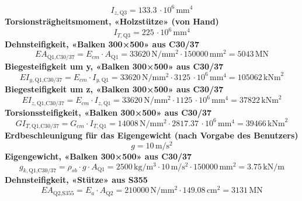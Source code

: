 \documentclass[11pt,a4paper]{article}
\begin{document}
\begin{equation*}
I_{z,\text{Q3}} = 133.3\,\cdot 10^{6}\,\mathrm{mm}^{4}
\end{equation*}
\noindent\textbf{Torsionsträgheitsmoment, «Holzstütze» (von Hand)}
\begin{equation*}
I_{T,\text{Q3}} = 225\,\cdot 10^{6}\,\mathrm{mm}^{4}
\end{equation*}
\noindent\textbf{Dehnsteifigkeit, «Balken 300×500» aus C30/37}
\begin{equation*}
EA_{\text{Q1,C30/37}} = E_{cm} \cdot A_{\text{Q1}} = 33620\,\mathrm{N}/\mathrm{mm}^{2} \cdot 150000\,\mathrm{mm}^{2} = 5043\,\mathrm{MN}
\end{equation*}
\noindent\textbf{Biegesteifigkeit um y, «Balken 300×500» aus C30/37}
\begin{equation*}
EI_{y,\text{Q1,C30/37}} = E_{cm} \cdot I_{y,\text{Q1}} = 33620\,\mathrm{N}/\mathrm{mm}^{2} \cdot 3125\,\cdot 10^{6}\,\mathrm{mm}^{4} = 105062\,\mathrm{kNm}^{2}
\end{equation*}
\noindent\textbf{Biegesteifigkeit um z, «Balken 300×500» aus C30/37}
\begin{equation*}
EI_{z,\text{Q1,C30/37}} = E_{cm} \cdot I_{z,\text{Q1}} = 33620\,\mathrm{N}/\mathrm{mm}^{2} \cdot 1125\,\cdot 10^{6}\,\mathrm{mm}^{4} = 37822\,\mathrm{kNm}^{2}
\end{equation*}
\noindent\textbf{Torsionssteifigkeit, «Balken 300×500» aus C30/37}
\begin{equation*}
GI_{T,\text{Q1,C30/37}} = G_{cm} \cdot I_{T,\text{Q1}} = 14008\,\mathrm{N}/\mathrm{mm}^{2} \cdot 2817.37\,\cdot 10^{6}\,\mathrm{mm}^{4} = 39466\,\mathrm{kNm}^{2}
\end{equation*}
\noindent\textbf{Erdbeschleunigung für das Eigengewicht (nach Vorgabe des Benutzers)}
\begin{equation*}
g = 10\,\mathrm{m}/\mathrm{s}^{2}
\end{equation*}
\noindent\textbf{Eigengewicht, «Balken 300×500» aus C30/37}
\begin{equation*}
g_{k,\text{Q1,C30/37}} = \rho_{sb} \cdot g \cdot A_{\text{Q1}} = 2500\,\mathrm{kg}/\mathrm{m}^{3} \cdot 10\,\mathrm{m}/\mathrm{s}^{2} \cdot 150000\,\mathrm{mm}^{2} = 3.75\,\mathrm{kN}/\mathrm{m}
\end{equation*}
\noindent\textbf{Dehnsteifigkeit, «Stütze» aus S355}
\begin{equation*}
EA_{\text{Q2,S355}} = E_a \cdot A_{\text{Q2}} = 210000\,\mathrm{N}/\mathrm{mm}^{2} \cdot 149.08\,\mathrm{cm}^{2} = 3131\,\mathrm{MN}
\end{equation*}
\end{document}
